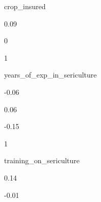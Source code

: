 \documentclass[
]{article}
\begin{document}
{ }

{ }

{ }

crop\_insured

{0.09 }

{0 }

{1 }

{ }

{ }

{ }

{ }

{ }

{ }

{ }

{ }

{ }

{ }

{ }

{ }

{ }

{ }

{ }

{ }

{ }

{ }

{ }

{ }

{ }

years\_of\_exp\_in\_sericulture

{-0.06}

{0.06 }

{-0.15}

{1 }

{ }

{ }

{ }

{ }

{ }

{ }

{ }

{ }

{ }

{ }

{ }

{ }

{ }

{ }

{ }

{ }

{ }

{ }

{ }

{ }

training\_on\_sericulture

{0.14 }

{-0.01}
\end{document}
